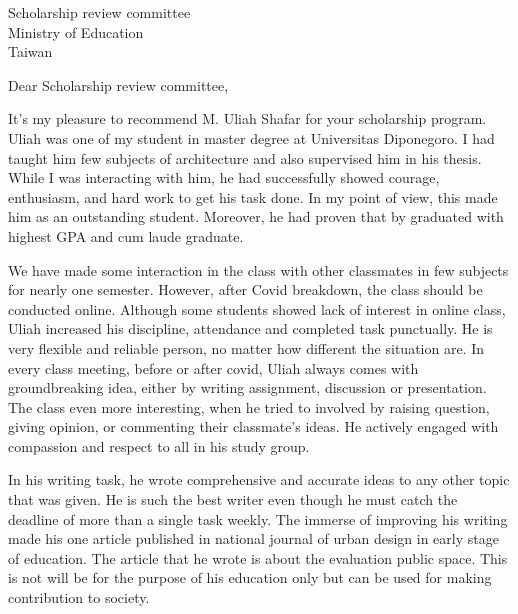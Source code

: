 \documentclass[12pt, a4paper]{simref} %
\begin{document}

\begin{letter}{
	Scholarship review committee\\
	Ministry of Education\\
	Taiwan\\
}


\opening{Dear Scholarship review committee,}

It's my pleasure to recommend M. Uliah Shafar for your scholarship program. Uliah was one of my student in master degree at Universitas Diponegoro. I had taught him few subjects of architecture and also supervised him in his thesis. While I was interacting with him, he had successfully showed courage, enthusiasm, and hard work to get his task done. In my point of view, this made him as an outstanding student. Moreover, he had proven that by graduated with highest GPA and cum laude graduate.

We have made some interaction in the class with other classmates in few subjects for nearly one semester. However, after Covid breakdown, the class should be conducted online. Although some students showed lack of interest in online class, Uliah increased his discipline, attendance and completed task punctually. He is very flexible and reliable person, no matter how different the situation are. In every class meeting, before or after covid, Uliah always comes with groundbreaking idea, either by writing assignment, discussion or presentation. The class even more interesting, when he tried to involved by raising question, giving opinion, or commenting their classmate's ideas. He actively engaged with compassion and respect to all in his study group.

In his writing task, he wrote comprehensive and accurate ideas to any other topic that was given.
He is such the best writer
even though he must catch the deadline of more than a single task weekly. The immerse of improving his writing made his one article published in national journal of urban design in early stage of education. The article that he wrote is about the evaluation public space. This is not will be for the purpose of his education only but can be used for making contribution to society.



\end{letter}
\end{document}
